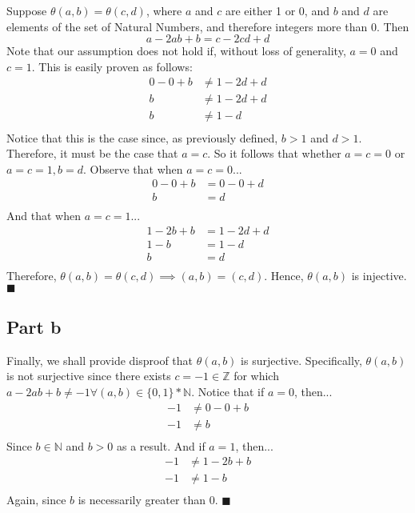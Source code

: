 \documentclass{article}
\newcommand*{\QEDA}{\hfill\ensuremath{\blacksquare}}%
\begin{document}
Suppose $\theta(a,b) = \theta(c,d)$, where $a$ and $c$ are either 1 or 0, and $b$ and $d$ are elements of the set of Natural Numbers, and therefore integers more than 0. Then 
	\begin{equation}
	a - 2ab + b = c - 2cd + d
	\end{equation}
	Note that our assumption does not hold if, without loss of generality, $a = 0$ and $c = 1$. This is easily proven as follows:
	\begin{align*}
	0 - 0 + b &\neq 1 - 2d + d\\
	b &\neq 1 - 2d + d\\
	b &\neq 1 - d\\
	\end{align*}
	Notice that this is the case since, as previously defined, $b > 1$ and $d > 1$. Therefore, it must be the case that $a = c$. So it follows that whether $a = c = 0$ or $a = c = 1, b = d$. Observe that when $a = c = 0$...
	\begin{align*}
	0 - 0 + b &= 0 - 0 + d\\
	b &= d\\
	\end{align*}
	And that when $a = c = 1$...
	\begin{align*}
	1 - 2b + b &= 1 - 2d + d\\
	1 - b &= 1 - d\\
	b &= d\\
	\end{align*}
	Therefore, $\theta(a,b) = \theta(c,d) \implies (a,b) = (c,d)$. Hence, $\theta(a,b)$ is injective. \QEDA
	
	\subsection{Part b} Finally, we shall provide disproof that $\theta(a,b)$ is surjective. Specifically, $\theta(a,b)$ is not surjective since there exists $c = -1 \in \mathbb{Z}$ for which $a - 2ab + b \neq -1 \forall (a,b) \in \{0,1\} * \mathbb{N}$. Notice that if $a = 0$, then...
	\begin{align*}
	-1 &\neq 0 - 0 + b\\
	-1 &\neq b\\
	\end{align*}
	Since $b \in \mathbb{N}$ and $b > 0$ as a result. And if $a = 1$, then...
	\begin{align*}
	-1 &\neq 1 - 2b + b\\
	-1 &\neq 1 - b\\
	\end{align*}
	Again, since $b$ is necessarily greater than 0. \QEDA
	
\end{document}
